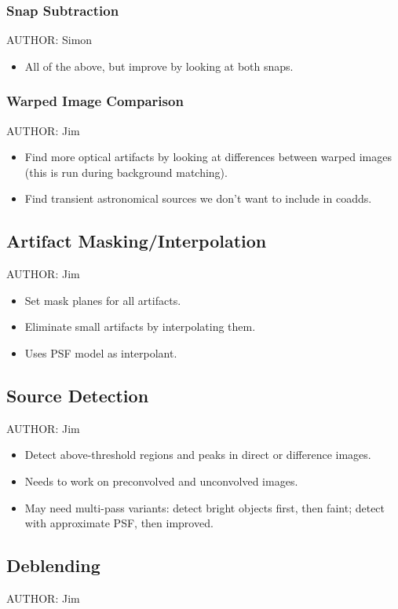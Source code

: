 \subsubsection{Snap Subtraction}
AUTHOR: Simon
\begin{itemize}
\item All of the above, but improve by looking at both snaps.
\end{itemize}

\subsubsection{Warped Image Comparison}
AUTHOR: Jim
\begin{itemize}
\item Find more optical artifacts by looking at differences between warped images (this is run during background matching).
\item Find transient astronomical sources we don't want to include in coadds.
\end{itemize}

\subsection{Artifact Masking/Interpolation}
AUTHOR: Jim
\begin{itemize}
\item Set mask planes for all artifacts.
\item Eliminate small artifacts by interpolating them.
\item Uses PSF model as interpolant.
\end{itemize}

\subsection{Source Detection}
AUTHOR: Jim
\begin{itemize}
\item Detect above-threshold regions and peaks in direct or difference images.
\item Needs to work on preconvolved and unconvolved images.
\item May need multi-pass variants: detect bright objects first, then faint; detect with approximate PSF, then improved.
\end{itemize}

\subsection{Deblending}
AUTHOR: Jim

